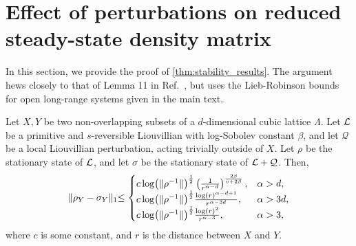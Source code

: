 \section{Effect of perturbations on reduced steady-state density matrix}
\label{app:proof-stability}
In this section, we provide the proof of \cref{thm:stability_results}. The argument hews closely to that of Lemma 11 in Ref.~\cite{Kastoryano2013}, but uses the Lieb-Robinson bounds for open long-range systems given in the main text.
\setcounter{theorem}{1}
\begin{theorem}
\label{thm:stability_results}
Let $X,Y$ be two non-overlapping subsets of a $d$-dimensional cubic lattice $\Lambda$.  Let $\mathcal{L} $  be a primitive and $s$-reversible Liouvillian with log-Sobolev constant $\beta$, and let $\mathcal{Q}$ be a local Liouvillian perturbation, acting trivially outside of $X$. Let $\rho$ be the stationary state of $\mathcal{L}$, and let $\sigma$ be the stationary state of $\mathcal{L}  + \mathcal{Q}$. Then,
\begin{equation}
\label{eq:perturbation_bounds_app}
\lVert \rho_Y - \sigma_Y  \lVert_1 \leq \begin{cases}
       c \log (  \lVert \rho^{-1}  \lVert)^{\frac12} \left(\frac1{r^{\alpha - d}} \right)^{\frac{2 \beta}{ v + 2\beta}},& \al > d,
    \\ c \log (  \lVert \rho^{-1}  \lVert)^{\frac12} \frac{\log(r)^{\al-d+1}}{r^{\al-3d}},& \al > 3d, %
    \\ c \log (  \lVert \rho^{-1}  \lVert)^{\frac12} \frac{\log(r)^2}{r^{\al-3}},& \al> 3,
    \end{cases}
\end{equation}
where $c$ is some constant, and $r$ is the distance between $X$ and $Y$.
\end{theorem}
